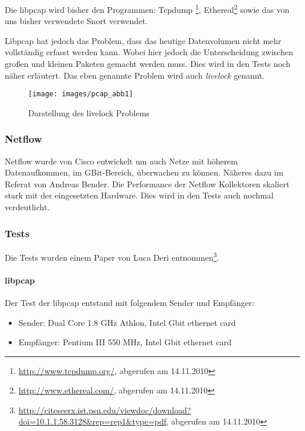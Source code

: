 Die libpcap wird bisher den Programmen: Tcpdump%
\footnote{\url{http://www.tcpdump.org/}, abgerufen am 14.11.2010}, 
Ethereal\footnote{\url{http://www.ethereal.com/}, abgerufen am 14.11.2010}
sowie das von uns bisher verwendete Snort verwendet.

Libpcap hat jedoch das Problem, dass das heutige Datenvolumen nicht mehr
vollständig erfasst werden kann. Wobei hier jedoch die Unterscheidung
zwischen großen und kleinen Paketen gemacht werden muss. Dies wird in
den Tests noch näher erläutert. Das eben genannte Problem wird auch
\textsl{livelock} genannt.

\begin{figure}
  \centering
  \texttt{[image: images/pcap\_abb1]}
  \caption{Darstellung des livelock Problems}
  \label{fig:netflow-security:livelock}
\end{figure}
 
\subsubsection{Netflow}

Netflow wurde von Cisco entwickelt um auch Netze mit höherem
Datenaufkommen, im GBit-Bereich, überwachen zu können. Näheres dazu im
Referat von Andreas Bender. Die Performance der Netflow Kollektoren skaliert stark mit der
eingesetzten Hardware. Dies wird in den Tests auch nochmal verdeutlicht.

\subsubsection{Tests}

Die Tests wurden einem Paper von Luca Deri entnommen\footnote{%
\url{http://citeseerx.ist.psu.edu/viewdoc/download?doi=10.1.1.58.3128&rep=rep1&type=pdf},
abgerufen am 14.11.2010}.

\paragraph{libpcap}

Der Test der libpcap entstand mit folgendem Sender und Empfänger:

\begin{itemize}
 \item Sender: Dual Core 1.8 GHz Athlon, Intel Gbit ethernet card
 \item Empfänger: Pentium III 550 MHz, Intel Gbit ethernet card
\end{itemize}

